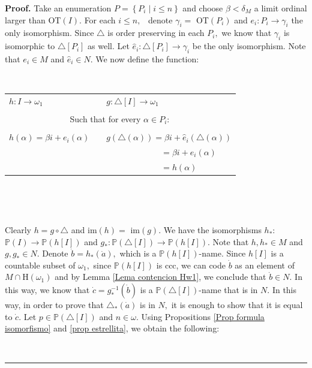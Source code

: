 \documentclass{article}%
\newenvironment{proof}[1][Proof]{\noindent\textbf{#1.} }{\ \rule{0.5em}{0.5em}}
\begin{document}
\begin{proof}
Take an enumeration $P=\left\{  P_{i}\mid i\leq n\right\}  $ and choose
$\beta<\delta_{M}$ a limit ordinal larger than \textsf{OT}$\left(  I\right)
.$ For each $i\leq n,$ \ denote $\gamma_{i}=$ \textsf{OT}$\left(
P_{i}\right)  $ and $e_{i}:P_{i}\longrightarrow\gamma_{i}$ the only
isomorphism. Since $\triangle$ is order preserving in each $P_{i},$ we know
that $\gamma_{i}$ is isomorphic to $\triangle\left[  P_{i}\right]  $ as well.
Let $\widehat{e}_{i}:\triangle\left[  P_{i}\right]  \longrightarrow\gamma_{i}$
be the only isomorphism. Note that $e_{i}\in M$ and $\widehat{e}_{i}\in N.$ We
now define the function:

\qquad\ \ \ 

\hfill%
\begin{tabular}
[c]{lll}%
$h:I\longrightarrow\omega_{1}$ &  & $g:\triangle\left[  I\right]
\longrightarrow\omega_{1}$\\
\multicolumn{1}{c}{} & \multicolumn{1}{c}{} & \multicolumn{1}{c}{}\\
\multicolumn{3}{c}{Such that for every $\alpha\in P_{i}:$}\\
\multicolumn{1}{c}{} & \multicolumn{1}{c}{} & \multicolumn{1}{c}{}\\
$h\left(  \alpha\right)  =\beta i+e_{i}\left(  \alpha\right)  $ &  & $g\left(
\triangle\left(  \alpha\right)  \right)  =\beta i+\widehat{e}_{i}\left(
\triangle\left(  \alpha\right)  \right)  $\\
&  & \ \ \ \ \ \ \ \ \ \ \ \ \ $=\beta i+e_{i}\left(  \alpha\right)  $\\
&  & \ \ \ \ \ \ \ \ \ \ \ \ \ $=h\left(  \alpha\right)  $%
\end{tabular}
\qquad\ \hfill

\qquad\ \qquad\ \ \ \ \ \ \qquad\ \ \ \ \ 

Clearly $h=g\circ\triangle$ and \textsf{im}$\left(  h\right)  =$
\textsf{im}$\left(  g\right)  .$ We have the isomorphisms $h_{\ast}:$
$\mathbb{P}\left(  I\right)  \longrightarrow\mathbb{P}\left(  h\left[
I\right]  \right)  $ and $g_{\ast}:\mathbb{P}\left(  \triangle\left[
I\right]  \right)  \longrightarrow\mathbb{P}\left(  h\left[  I\right]
\right)  $. Note that $h,h_{\ast}\in M$ and $g,g_{\ast}\in N.$ Denote $\dot
{b}=h_{\ast}\left(  \dot{a}\right)  ,$ which is a $\mathbb{P}\left(  h\left[
I\right]  \right)  $-name. Since $h\left[  I\right]  $ is a countable subset
of $\omega_{1},$ since $\mathbb{P}\left(  h\left[  I\right]  \right)  $ is
ccc, we can code $\dot{b}$ as an element of $M\cap$\textsf{H}$\left(
\omega_{1}\right)  $ and by Lemma \ref{Lema contencion Hw1}, we conclude that
$\dot{b}\in N.$ In this way, we know that $\dot{c}=g_{\ast}^{-1}(\dot{b})$ is
a $\mathbb{P}\left(  \triangle\left[  I\right]  \right)  $-name that is in
$N.$ In this way, in order to prove that $\triangle_{\ast}\left(  \dot
{a}\right)  $ is in $N,$ it is enough to show that it is equal to $\dot{c}.$
Let $p\in\mathbb{P}\left(  \triangle\left[  I\right]  \right)  $ and
$n\in\omega.$ Using Propositions \ref{Prop formula isomorfismo} and
\ref{prop estrellita}, we obtain the following:


\end{proof}
\end{document}
